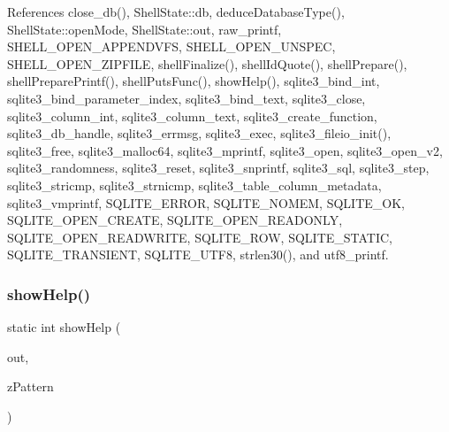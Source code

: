 References close\+\_\+db(), Shell\+State\+::db, deduce\+Database\+Type(), Shell\+State\+::open\+Mode, Shell\+State\+::out, raw\+\_\+printf, S\+H\+E\+L\+L\+\_\+\+O\+P\+E\+N\+\_\+\+A\+P\+P\+E\+N\+D\+V\+FS, S\+H\+E\+L\+L\+\_\+\+O\+P\+E\+N\+\_\+\+U\+N\+S\+P\+EC, S\+H\+E\+L\+L\+\_\+\+O\+P\+E\+N\+\_\+\+Z\+I\+P\+F\+I\+LE, shell\+Finalize(), shell\+Id\+Quote(), shell\+Prepare(), shell\+Prepare\+Printf(), shell\+Puts\+Func(), show\+Help(), sqlite3\+\_\+bind\+\_\+int, sqlite3\+\_\+bind\+\_\+parameter\+\_\+index, sqlite3\+\_\+bind\+\_\+text, sqlite3\+\_\+close, sqlite3\+\_\+column\+\_\+int, sqlite3\+\_\+column\+\_\+text, sqlite3\+\_\+create\+\_\+function, sqlite3\+\_\+db\+\_\+handle, sqlite3\+\_\+errmsg, sqlite3\+\_\+exec, sqlite3\+\_\+fileio\+\_\+init(), sqlite3\+\_\+free, sqlite3\+\_\+malloc64, sqlite3\+\_\+mprintf, sqlite3\+\_\+open, sqlite3\+\_\+open\+\_\+v2, sqlite3\+\_\+randomness, sqlite3\+\_\+reset, sqlite3\+\_\+snprintf, sqlite3\+\_\+sql, sqlite3\+\_\+step, sqlite3\+\_\+stricmp, sqlite3\+\_\+strnicmp, sqlite3\+\_\+table\+\_\+column\+\_\+metadata, sqlite3\+\_\+vmprintf, S\+Q\+L\+I\+T\+E\+\_\+\+E\+R\+R\+OR, S\+Q\+L\+I\+T\+E\+\_\+\+N\+O\+M\+EM, S\+Q\+L\+I\+T\+E\+\_\+\+OK, S\+Q\+L\+I\+T\+E\+\_\+\+O\+P\+E\+N\+\_\+\+C\+R\+E\+A\+TE, S\+Q\+L\+I\+T\+E\+\_\+\+O\+P\+E\+N\+\_\+\+R\+E\+A\+D\+O\+N\+LY, S\+Q\+L\+I\+T\+E\+\_\+\+O\+P\+E\+N\+\_\+\+R\+E\+A\+D\+W\+R\+I\+TE, S\+Q\+L\+I\+T\+E\+\_\+\+R\+OW, S\+Q\+L\+I\+T\+E\+\_\+\+S\+T\+A\+T\+IC, S\+Q\+L\+I\+T\+E\+\_\+\+T\+R\+A\+N\+S\+I\+E\+NT, S\+Q\+L\+I\+T\+E\+\_\+\+U\+T\+F8, strlen30(), and utf8\+\_\+printf.


\mbox{\label{shell_8c_a3f1925de1da6ad4f21ee0e5e53940066}} 
\subsubsection{show\+Help()}
{\footnotesize\ttfamily static int show\+Help (\begin{DoxyParamCaption}\item[{F\+I\+LE $\ast$}]{out,  }\item[{const char $\ast$}]{z\+Pattern }\end{DoxyParamCaption})\hspace{0.3cm}{\ttfamily [static]}}



